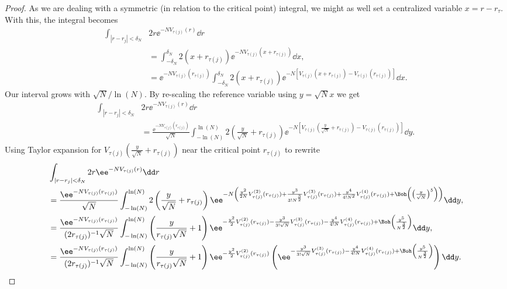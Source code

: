 \begin{proof}
	As we are dealing with a symmetric (in relation to the critical point) integral, we might as well set a centralized variable $x = r - r_\tau$. With this, the integral becomes
	\begin{align}
		\int_{|r - r_j| < \delta_N} & 2r \ee^{-N V_{\tau(j)}(r)} \dd r \\
		 & = \int_{-\delta_N}^{\delta_N} 2 (x + r_{\tau(j)}) \ee^{-N V_{\tau(j)}(x + r_{\tau(j)})} \dd x, \\
		& = \ee^{-N V_{\tau(j)}(r_{\tau(j)})}  \int_{-\delta_N}^{\delta_N} 2 (x + r_{\tau(j)}) \ee^{-N \left[ V_{\tau(j)}(x + r_{\tau(j)}) - V_{\tau(j)}(r_{\tau(j)})\right]} \dd x.
	\end{align}
	Our interval grows with $\sqrt{N}/\ln(N)$. By re-scaling the reference variable using $y = \sqrt{N} x$ we get
	\begin{align}
		\int_{|r - r_j| < \delta_N} & 2r \ee^{-N V_{\tau(j)}(r)} \dd r\\ 
		&= \frac{\ee^{-N V_{\tau(j)}(r_{\tau(j)})}}{\sqrt{N}}  \int_{-\ln(N)}^{\ln(N)} 2 \left(\frac{y}{\sqrt{N}} + r_{\tau(j)} \right) \ee^{-N \left[ V_{\tau(j)}(\frac{y}{\sqrt{N}} + r_{\tau(j)}) - V_{\tau(j)}(r_{\tau(j)})\right]} \dd y.
	\end{align}
	Using Taylor expansion for $V_{\tau(j)}\left(\frac{y}{\sqrt{N}} + r_{\tau(j)}\right )$ near the critical point $r_{\tau(j)}$ to rewrite 
	\begin{align}
		& \int_{|r - r_j| < \delta_N} 2r \ee^{-N V_{\tau(j)}(r)} \dd r\\ 
		&  =\frac{\ee^{-N V_{\tau(j)}(r_{\tau(j)})}}{\sqrt{N}}  \int_{-\ln(N)}^{\ln(N)} 2 \left(\frac{y}{\sqrt{N}} + r_{\tau(j)} \right) \ee^{-N \left(\frac{y^2}{2N} V^{(2)}_{\tau(j)}(r_{\tau(j)}) + \frac{y^3}{3! N^{\frac{3}{2}}} V^{(3)}_{\tau(j)}(r_{\tau(j)}) + \frac{y^4}{4! N^2} V^{(4)}_{\tau(j)}(r_{\tau(j)})+ \Boh\left(\left(\frac{y}{\sqrt{N}}\right)^5\right) \right)} \dd y, \\
		& = \frac{\ee^{-N V_{\tau(j)}(r_{\tau(j)})}}{(2 r_{\tau(j)} )^{-1}\sqrt{N}}  \int_{-\ln(N)}^{\ln(N)} \left(\frac{y}{r_{\tau(j)}\sqrt{N}} + 1 \right) \ee^{-\frac{y^2}{2} V^{(2)}_{\tau(j)}(r_{\tau(j)}) - \frac{y^3}{3! \sqrt{N}} V^{(3)}_{\tau(j)}(r_{\tau(j)}) - \frac{y^4}{4! N} V^{(4)}_{\tau(j)}(r_{\tau(j)}) + \Boh\left(\frac{y^5}{N^\frac{3}{2}}\right)} \dd y, \\
		& = \frac{\ee^{-N V_{\tau(j)}(r_{\tau(j)})}}{(2 r_{\tau(j)} )^{-1}\sqrt{N}}  \int_{-\ln(N)}^{\ln(N)} \left(\frac{y}{r_{\tau(j)}\sqrt{N}} + 1 \right) \ee^{-\frac{y^2}{2} V^{(2)}_{\tau(j)}(r_{\tau(j)})} \left(\ee^{- \frac{y^3}{3! \sqrt{N}} V^{(3)}_{\tau(j)}(r_{\tau(j)}) - \frac{y^4}{4! N} V^{(4)}_{\tau(j)}(r_{\tau(j)}) + \Boh\left(\frac{y^5}{N^\frac{3}{2}}\right)}\right) \dd y.

\end{align}
\end{proof}
